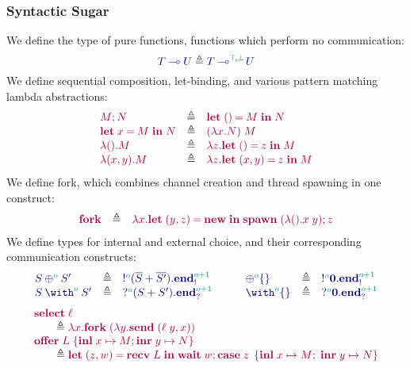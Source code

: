 \documentclass[main.tex]{subfiles}
\begin{document}
\subsubsection{Syntactic Sugar}%
\label{sec:pgv-syntax-sugar}
We define the type of pure functions, \ie functions which perform no communication:
\[
  \ty{\tylolli{T}{U}} \elabarrow \ty{\tylolli[\cs{\ptop},\cs{\pbot}]{T}{U}}
\]
We define sequential composition, let-binding, and various pattern matching lambda abstractions:
\[
\begin{array}{lcl}
  \tm{\andthen{M}{N}}
  & \elabarrow & \tm{\letunit{M}{N}} \\
  \tm{\letbind{x}{M}{N}}
  & \elabarrow & \tm{(\lambda x.N)\;M} \\
  \tm{\lambda\unit.M}
  & \elabarrow & \tm{\lambda z.\letunit{z}{M}} \\
  \tm{\lambda\pair{x}{y}.M}
  & \elabarrow & \tm{\lambda z.\letpair{x}{y}{z}{M}}
\end{array}
\]
We define fork, which combines channel creation and thread spawning in one construct:
\[
\begin{array}{lcl}
  \tm{\fork}
  & \elabarrow & \tm{\lambda x.\letpair{y}{z}{\new}{\andthen{\spawn\;{(\lambda\unit.x\;y)}}{z}}}
\end{array}
\]
We define types for internal and external choice, and their corresponding communication constructs:
\[
\begin{array}{lcl}
  \ty{\tyselect[\cs{o}]{S}{S'}}
  & \elabarrow & \ty{\tysend[\cs{o}]{(\tysum{\co{S}}{\co{S'}})}{\tyends[\cs{o+1}]}} \\
  \ty{\tyoffer[\cs{o}]{S}{S'}}
  & \elabarrow & \ty{\tyrecv[\cs{o}]{(\tysum{S}{S'})}{\tyendr[\cs{o+1}]}}
\end{array}
\qquad
\begin{array}{lcl}
  \ty{\tyselectemp[\cs{o}]}
  & \elabarrow & \ty{\tysend[\cs{o}]{\tyvoid}{\tyends[\cs{o+1}]}} \\
  \ty{\tyofferemp[\cs{o}]}
  & \elabarrow & \ty{\tyrecv[\cs{o}]{\tyvoid}{\tyendr[\cs{o+1}]}} \\
\end{array}
\]
\[
\begin{array}{l}
  \tm{\select{\ell}}
  \\
  \qquad\elabarrow\tm{\lambda x.\fork\;{(\lambda y.\send\;{\pair{\ell\;y}{x}})}}
  \\
  \tm{\offer{L}{x}{M}{y}{N}}
  \\
  \qquad\elabarrow\tm{\letpair{z}{w}{\recv\;{L}}{\andthen{\wait\;{w}}{\casesum{z}{x}{M}{y}{N}}}}
\end{array}
\]
\end{document}
